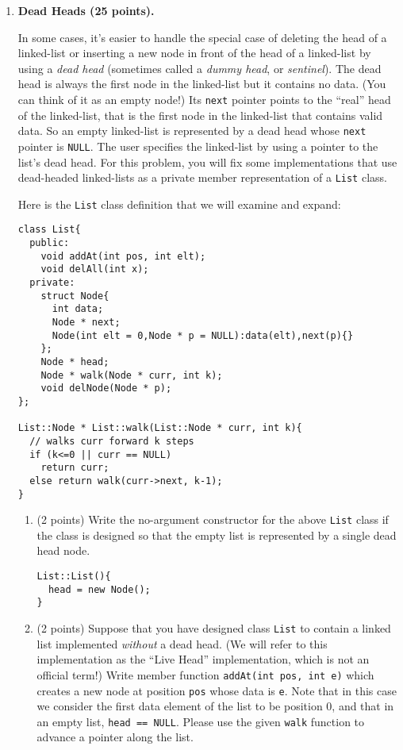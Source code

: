 \documentclass[11pt,table]{article}
\def\problem#1{\def\problemheading{#1}\clearpage\item{\bf #1.}}
\begin{document}
\newpage
\begin{enumerate}

\newcommand{\I}{\ensuremath{\mathit{I}}}
\renewcommand{\O}{\ensuremath{\mathit{O}}}
\renewcommand{\E}{\ensuremath{\mathit{E}}}
\newcommand{\D}{\ensuremath{\mathit{D}}}

\problem{Dead Heads (25 points)}

In some cases, it's easier to handle the special case of deleting the head of a linked-list or inserting a new node in front of the head of a linked-list by using a \emph{dead head} (sometimes called a \emph{dummy head}, or \emph{sentinel}).
The dead head is always the first node in the linked-list but it contains no data. (You can think of it as an empty node!)
Its \texttt{next} pointer points to the ``real'' head of the linked-list, that is the first node in the linked-list that contains valid data.
So an empty linked-list is represented by a dead head whose \texttt{next} pointer is \texttt{NULL}.  
The user specifies the linked-list by using a pointer to the list's dead head.
For this problem, you will fix some implementations that use dead-headed linked-lists as a private member representation of a \texttt{List} class.

Here is the \texttt{List} class definition that we will examine and expand:
\begin{verbatim}
class List{
  public: 
    void addAt(int pos, int elt);
    void delAll(int x);
  private:
    struct Node{
      int data;
      Node * next;
      Node(int elt = 0,Node * p = NULL):data(elt),next(p){}
    };
    Node * head;
    Node * walk(Node * curr, int k);
    void delNode(Node * p);
};

List::Node * List::walk(List::Node * curr, int k){
  // walks curr forward k steps
  if (k<=0 || curr == NULL)
    return curr;
  else return walk(curr->next, k-1);
}

\end{verbatim}

\begin{enumerate}
\item (2 points) Write the no-argument constructor for the above \texttt{List} class if the class is designed so that the empty list is represented by a single dead head node.

\begin{Verbatim}[frame=single,framerule=2pt]
List::List(){
  head = new Node();
}
\end{Verbatim}

\item (2 points)
Suppose that you have designed class \texttt{List} to contain a linked list implemented \emph{without} a dead head. (We will refer to this implementation as the ``Live Head'' implementation, which is not an official term!) Write member function \texttt{addAt(int pos, int e)} which creates a new node at position \texttt{pos} whose data is \texttt{e}. Note that in this case we consider the first data element of the list to be position 0, and that in an empty list, \texttt{head == NULL}. Please use the given \texttt{walk} function to advance
a pointer along the list.


\end{enumerate}
\end{enumerate}
\end{document}
